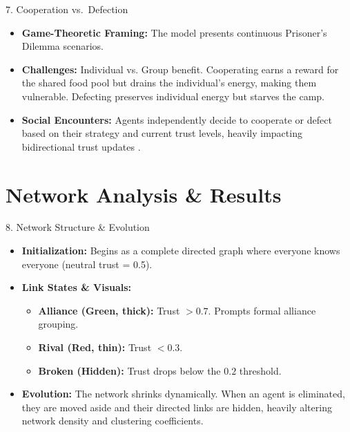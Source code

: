 \documentclass{beamer}
\begin{document}
\begin{frame}{7. Cooperation vs.\ Defection}
    \begin{itemize}
        \item \textbf{Game-Theoretic Framing:} The model presents continuous Prisoner's Dilemma scenarios.
        \item \textbf{Challenges:} Individual vs. Group benefit. Cooperating earns a reward for the shared food pool but drains the individual's energy, making them vulnerable. Defecting preserves individual energy but starves the camp.
        \item \textbf{Social Encounters:} Agents independently decide to cooperate or defect based on their strategy and current trust levels, heavily impacting bidirectional trust updates \cite{Mui}.
    \end{itemize}
\end{frame}

\section{Network Analysis \& Results}

\begin{frame}{8. Network Structure \& Evolution}
    \begin{itemize}
        \item \textbf{Initialization:} Begins as a complete directed graph where everyone knows everyone (neutral trust = 0.5).
        \item \textbf{Link States \& Visuals:}
        \begin{itemize}
            \item \textbf{Alliance (Green, thick):} Trust $> 0.7$. Prompts formal alliance grouping.
            \item \textbf{Rival (Red, thin):} Trust $< 0.3$.
            \item \textbf{Broken (Hidden):} Trust drops below the $0.2$ threshold.
        \end{itemize}
        \item \textbf{Evolution:} The network shrinks dynamically. When an agent is eliminated, they are moved aside and their directed links are hidden, heavily altering network density and clustering coefficients.
    \end{itemize}
\end{frame}
\end{document}
